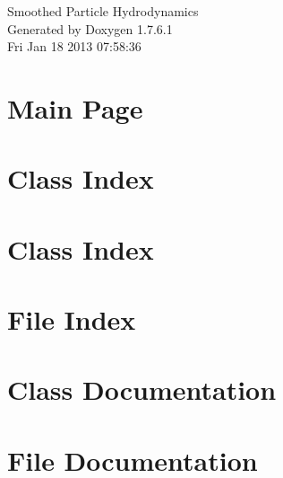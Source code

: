\documentclass[a4paper]{book}
\begin{document}
\hypersetup{pageanchor=false,citecolor=blue}
\begin{titlepage}
\vspace*{7cm}
\begin{center}
{\Large \-Smoothed \-Particle \-Hydrodynamics }\\
\vspace*{1cm}
{\large \-Generated by Doxygen 1.7.6.1}\\
\vspace*{0.5cm}
{\small Fri Jan 18 2013 07:58:36}\\
\end{center}
\end{titlepage}
\clearemptydoublepage
{}
\tableofcontents
\clearemptydoublepage
{}
\hypersetup{pageanchor=true,citecolor=blue}
\chapter{\-Main \-Page}
\label{index}\hypertarget{index}{}
\chapter{\-Class \-Index}

\chapter{\-Class \-Index}

\chapter{\-File \-Index}

\chapter{\-Class \-Documentation}














\chapter{\-File \-Documentation}






















\printindex
\end{document}
